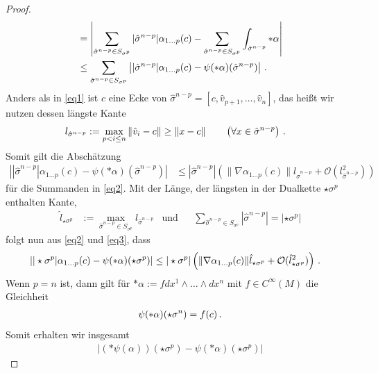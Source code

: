 \begin{proof}
\begin{align}
          &= \left| \sum_{\hat\sigma^{n-p}\in S_{\sigma^{p}}}|\hat\sigma^{n-p}|\alpha_{1 \ldots p}(c) 
                  - \sum_{\hat\sigma^{n-p}\in S_{\sigma^{p}}} \int_{\hat\sigma^{n-p}}*\alpha\right| \\
          &\le \sum_{\hat\sigma^{n-p}\in S_{\sigma^{p}}} \left||\hat\sigma^{n-p}|\alpha_{1 \ldots p}(c) - \psi(*\alpha)(\hat\sigma^{n-p}) \right| \,\text{.}\label{eq2}
    \end{align}
    Anders als in \eqref{eq1} ist \( c \) eine Ecke von \( \hat\sigma^{n-p}=\left[ c,\hat{v}_{p+1},\ldots,\hat{v}_{n} \right] \), das heißt wir nutzen dessen längste Kante 
    \begin{align}
      l_{\hat\sigma^{n-p}} &:= \max_{p < i \le n}\|\hat{v}_{i}-c\| \ge \|x-c\| \qquad\left( \forall x \in \hat\sigma^{n-p} \right) \,\text{.}
    \end{align}
    Somit gilt die Abschätzung
    \begin{align}
      \left||\hat\sigma^{n-p}|\alpha_{1 \ldots p}(c) - \psi(*\alpha)(\hat\sigma^{n-p}) \right|
        &\le |\hat\sigma^{n-p}| \left( \|\nabla\alpha_{1 \ldots p}(c)\| l_{\hat\sigma^{n-p}} + \mathcal{O}(l_{\hat\sigma^{n-p}}^{2}) \right) \label{eq3}
    \end{align}
    für die Summanden in \eqref{eq2}.
    Mit der Länge, der längsten in der Dualkette \( \star\sigma^{p} \) enthalten Kante,
    \begin{align}
      \hat{l}_{\star\sigma^{p}} &:= \max_{\hat\sigma^{n-p}\in S_{\sigma^{p}}} l_{\hat\sigma^{n-p}} 
      &\text{und}&&
      \sum_{\hat\sigma^{n-p} \in S_{\sigma^{p}}} |\hat\sigma^{n-p}| = |\star\sigma^{p}|
    \end{align}
    folgt nun aus \eqref{eq2} und \eqref{eq3}, dass
    \begin{align}
       \left| |\star\sigma^{p}|\alpha_{1 \ldots p}(c) - \psi(*\alpha)(\star\sigma^{p})\right| 
         &\le |\star\sigma^{p}| \left( \|\nabla\alpha_{1 \ldots p}(c)\|\hat{l}_{\star\sigma^{p}}  + \mathcal{O}(\hat{l}_{\star\sigma^{p}}^{2}) \right) \,\text{.}
    \end{align}
    Wenn \( p = n \) ist, dann gilt für \( *\alpha:= f  dx^{1}\wedge\ldots\wedge dx^{n} \) mit \( f \in C^{\infty}(M) \) die Gleichheit
    \begin{align}
      \psi(*\alpha)(\star\sigma^{n}) = f(c) \,\text{.}
    \end{align}
    Somit erhalten wir insgesamt
    \begin{align}
      \left| (*\psi(\alpha))(\star\sigma^{p}) - \psi(*\alpha)(\star\sigma^{p})\right|

\end{align}
\end{proof}
